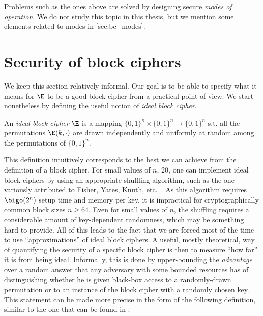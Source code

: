 Problems such as the ones above are solved by designing secure \emph{modes of operation}. We do not study this topic in this thesis, but
we mention some elements related to modes in \autoref{sec:bc_modes}.

\section{Security of block ciphers}
\label{sec:bc_sec}

We keep this section relatively informal. Our goal is to be able to specify what it means for $\E$ to be a good block cipher from
a practical point of view. We start nonetheless by defining the useful notion of \emph{ideal block cipher}.

\begin{defi}
An \emph{ideal block cipher} $\E$ is a mapping $\{0,1\}^\kappa \times \{0,1\}^n \rightarrow \{0,1\}^n$ s.t. all the permutations
$\E(k,\cdot)$ are drawn independently and uniformly at random among the permutations of $\{0,1\}^n$.
\end{defi}

This definition intuitively corresponds to the best we can achieve from the definition of a block cipher. For small values of $n$,
\eg $20$, one can implement ideal block ciphers by using an appropriate
shuffling algorithm, such as the one variously attributed to Fisher, Yates, Knuth, etc.~\cite{uniform_shuffle}.
As this algorithm 
requires $\bigo(2^n)$ setup time and memory per key, it is impractical for cryptographically common block sizes $n \geq 64$.
Even for small values of $n$, the shuffling requires a considerable amount of key-dependent randomness, which may be something hard
to provide.
All of this leads to the fact that we are forced most of the time to use ``approximations'' of
ideal block ciphers. A useful, mostly theoretical, way of quantifying the security of a specific block cipher is then  to measure ``how far'' it
is from being ideal. Informally, this is done by upper-bounding the \emph{advantage} over a random answer that any adversary
with some bounded resources
has of distinguishing whether he is given black-box access to a randomly-drawn permutation or to an instance of the block cipher
with a randomly chosen key. This statement can be made more precise in the form of the following definition,
similar to the one that can be found \eg in \cite{DBLP:journals/jcss/BellareKR00}:

